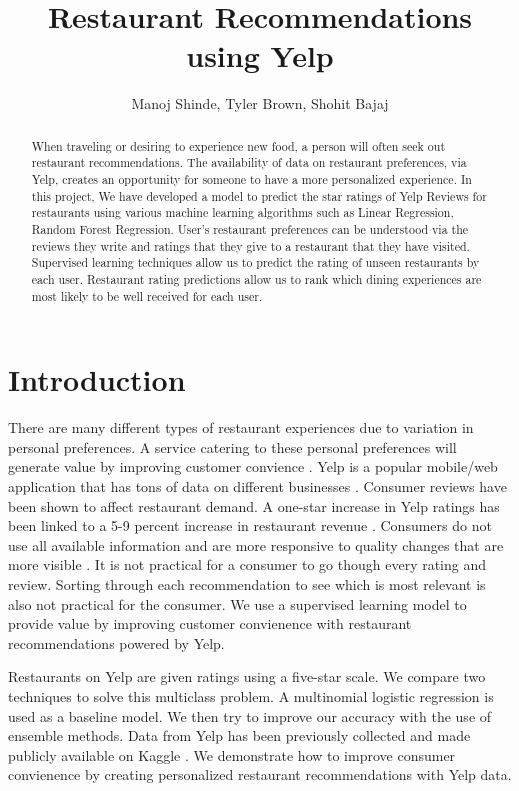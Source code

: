 \documentclass[12pt]{article}
\title{Restaurant Recommendations using Yelp}
\author{Manoj Shinde, Tyler Brown, Shohit Bajaj}
\date{ }
\begin{document}
\maketitle


\begin{abstract}
  When traveling or desiring to experience new food, a person will often seek out restaurant recommendations. 
  The availability of data on restaurant preferences, via Yelp, creates an opportunity for someone to have a more personalized experience. 
  In this project, We have developed a model to predict the star ratings of Yelp Reviews for restaurants using various machine learning algorithms 
  such as Linear Regression, Random Forest Regression. User’s restaurant preferences can be understood via the reviews they write and ratings that 
  they give to a restaurant that they have visited. Supervised learning techniques allow us to predict the rating of unseen restaurants by each user. 
  Restaurant rating predictions allow us to rank which dining experiences are most likely to be well received for each user. 
  \end{abstract}

\section{Introduction}

There are many different types of restaurant experiences due to variation in
personal preferences. A service catering to these personal preferences will
generate value by improving customer convience
\cite{mackay_vandevijvere_xie_lee_swinburn_2017}. Yelp is a popular mobile/web
application that has tons of data on different businesses \cite{Restaura71:online}.
Consumer reviews have been shown to affect restaurant demand. A one-star increase in
Yelp ratings has been linked to a 5-9 percent increase in restaurant revenue
\cite{luca2016reviews}. Consumers do not use all available information and are more
responsive to quality changes that are more visible \cite{luca2016reviews}. It is
not practical for a consumer to go though every rating and review. Sorting through
each recommendation to see which is most relevant is also not practical for the
consumer. We use a supervised learning model to provide value by improving customer
convienence with restaurant recommendations powered by Yelp.

Restaurants on Yelp are given ratings using a five-star scale. We compare two
techniques to solve this multiclass problem. A multinomial logistic regression
is used as a baseline model. We then try to improve our accuracy with the use of
ensemble methods. Data from Yelp has been previously collected and made publicly
available on Kaggle \cite{YelpData59:online}. We demonstrate how to improve
consumer convienence by creating personalized restaurant recommendations with
Yelp data.
\end{document}
